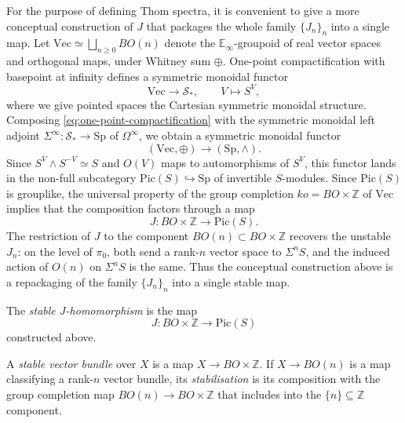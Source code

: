 \documentclass{amsart}
\begin{document}
For the purpose of defining Thom spectra, it is convenient to give a more conceptual construction of $J$ that packages the whole family $\{J_n\}_n$ into a single map. Let $\mathrm{Vec} \simeq \bigsqcup_{n \geq 0} BO(n)$ denote the $\mathbb{E}_\infty$-groupoid of real vector spaces and orthogonal maps, under Whitney sum $\oplus$. One-point compactification with basepoint at infinity defines a symmetric monoidal functor
\begin{equation}
\label{eq:one-point-compactification}
\mathrm{Vec} \to \mathcal{S}_*, \qquad V \mapsto S^V,
\end{equation}
where we give pointed spaces the Cartesian symmetric monoidal structure. Composing \eqref{eq:one-point-compactification} with the symmetric monoidal left adjoint $\Sigma^\infty : \mathcal{S}_* \to \mathrm{Sp}$ of $\Omega^\infty$, we obtain a symmetric monoidal functor
\[
(\mathrm{Vec}, \oplus) \to (\mathrm{Sp}, \wedge).
\]
Since $S^V \wedge S^{-V} \simeq S$ and $O(V)$ maps to automorphisms of $S^V$, this functor lands in the non-full subcategory $\mathrm{Pic}(S) \hookrightarrow \mathrm{Sp}$ of invertible $S$-modules. Since $\mathrm{Pic}(S)$ is grouplike, the universal property of the group completion $ko = BO \times \mathbb{Z}$ of $\mathrm{Vec}$ implies that the composition factors through a map
\[
J \colon BO \times \mathbb{Z} \longrightarrow \mathrm{Pic}(S).
\]
The restriction of $J$ to the component $BO(n) \subset BO \times \mathbb{Z}$ recovers the unstable $J_n$: on the level of $\pi_0$, both send a rank-$n$ vector space to $\Sigma^n S$, and the induced action of $O(n)$ on $\Sigma^n S$ is the same. Thus the conceptual construction above is a repackaging of the family $\{J_n\}_n$ into a single stable map.




\begin{definition}
\label{def:stable-J}
The \emph{stable $J$-homomorphism} is the map
\[
J \colon BO \times \mathbb{Z} \longrightarrow \mathrm{Pic}(S)
\]
constructed above.
\end{definition}

\begin{definition}
\label{def:stable-vector-bundle}
A \emph{stable vector bundle} over $X$ is a map $X \to BO \times \mathbb{Z}$. If $X \to BO(n)$ is a map classifying a rank-$n$ vector bundle, its \emph{stabilisation} is its composition with the group completion map $BO(n) \to BO \times \mathbb{Z}$ that includes into the $\{n\} \subseteq \mathbb{Z}$ component.
\end{definition}
\end{document}
